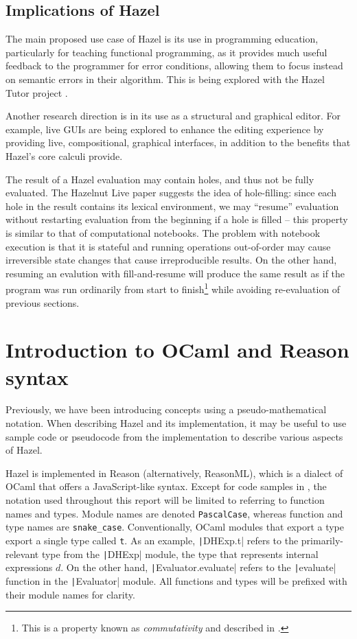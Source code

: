 \subsection{Implications of Hazel}
\label{sec:hazel-implications}

The main proposed use case of Hazel is its use in programming education, particularly for teaching functional programming, as it provides much useful feedback to the programmer for error conditions, allowing them to focus instead on semantic errors in their algorithm. This is being explored with the Hazel Tutor project \cite{potter2020hazel}.

Another research direction is in its use as a structural and graphical editor. For example, live GUIs \cite{omar2021filling} are being explored to enhance the editing experience by providing live, compositional, graphical interfaces, in addition to the benefits that Hazel's core calculi provide.

The result of a Hazel evaluation may contain holes, and thus not be fully evaluated. The Hazelnut Live paper \cite{conf/popl/HazelnutLive19} suggests the idea of hole-filling: since each hole in the result contains its lexical environment, we may ``resume'' evaluation without restarting evaluation from the beginning if a hole is filled -- this property is similar to that of computational notebooks. The problem with notebook execution is that it is stateful and running operations out-of-order may cause irreversible state changes that cause irreproducible results. On the other hand, resuming an evalution with fill-and-resume will produce the same result as if the program was run ordinarily from start to finish\footnote{This is a property known as \textit{commutativity} and described in \cite{conf/popl/HazelnutLive19}.} while avoiding re-evaluation of previous sections.

\section{Introduction to OCaml and Reason syntax}
\label{sec:ocaml-intro}

Previously, we have been introducing concepts using a pseudo-mathematical notation. When describing Hazel and its implementation, it may be useful to use sample code or pseudocode from the implementation to describe various aspects of Hazel.

Hazel is implemented in Reason (alternatively, ReasonML), which is a dialect of OCaml that offers a JavaScript-like syntax. Except for code samples in , the notation used throughout this report will be limited to referring to function names and types. Module names are denoted \texttt{PascalCase}, whereas function and type names are \texttt{snake\_case}. Conventionally, OCaml modules that export a type export a single type called \texttt{t}. As an example, \texttt|DHExp.t| refers to the primarily-relevant type from the \texttt|DHExp| module, the type that represents internal expressions $d$. On the other hand, \texttt|Evaluator.evaluate| refers to the \texttt|evaluate| function in the \texttt|Evaluator| module. All functions and types will be prefixed with their module names for clarity.

